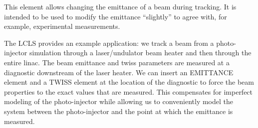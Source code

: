 This element allows changing the  emittance of a beam during tracking.
It  is intended to  be used  to modify  the emittance  ``slightly'' to
agree  with,  for   example,  experimental  measurements.   

The LCLS provides an example application: we track a beam from a
photo-injector simulation through a laser/undulator beam heater and
then through the entire linac.  The beam emittance and twiss
parameters are measured at a diagnostic downstream of the laser
heater.  We can insert an EMITTANCE element and a TWISS element at the
location of the diagnostic to force the beam properties to the exact
values that are measured.  This compensates for imperfect modeling of
the photo-injector while allowing us to conveniently model the system
between the photo-injector and the point at which the emittance is
measured.

